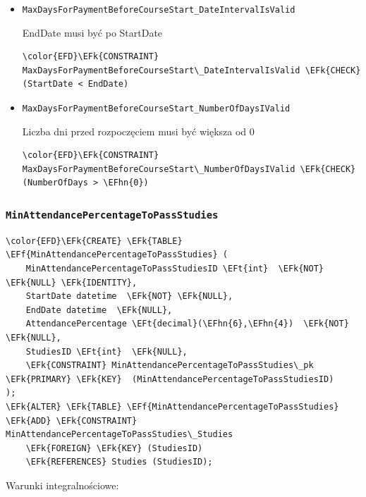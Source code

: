 \documentclass[11pt]{article}
\newcommand{\EFk}[1]{\textcolor{EFk}{\textbf{#1}}} %
\newcommand{\EFf}[1]{\textcolor{EFf}{#1}} %
\newcommand{\EFt}[1]{\textcolor{EFt}{\textbf{#1}}} %
\newcommand{\EFhn}[1]{\textcolor{EFhn}{#1}} %
\begin{document}
\begin{itemize}
\item \texttt{MaxDaysForPaymentBeforeCourseStart\_DateIntervalIsValid}

EndDate musi być po StartDate
\begin{Code}
\begin{Verbatim}
\color{EFD}\EFk{CONSTRAINT} MaxDaysForPaymentBeforeCourseStart\_DateIntervalIsValid \EFk{CHECK}
(StartDate < EndDate)
\end{Verbatim}
\end{Code}
\item \texttt{MaxDaysForPaymentBeforeCourseStart\_NumberOfDaysIValid}

Liczba dni przed rozpoczęciem musi być większa od 0
\begin{Code}
\begin{Verbatim}
\color{EFD}\EFk{CONSTRAINT} MaxDaysForPaymentBeforeCourseStart\_NumberOfDaysIValid \EFk{CHECK}
(NumberOfDays > \EFhn{0})
\end{Verbatim}
\end{Code}
\end{itemize}
\subsubsection{\texttt{MinAttendancePercentageToPassStudies}}
\label{sec:org1b6b5c1}
\begin{Code}
\begin{Verbatim}
\color{EFD}\EFk{CREATE} \EFk{TABLE} \EFf{MinAttendancePercentageToPassStudies} (
    MinAttendancePercentageToPassStudiesID \EFt{int}  \EFk{NOT} \EFk{NULL} \EFk{IDENTITY},
    StartDate datetime  \EFk{NOT} \EFk{NULL},
    EndDate datetime  \EFk{NULL},
    AttendancePercentage \EFt{decimal}(\EFhn{6},\EFhn{4})  \EFk{NOT} \EFk{NULL},
    StudiesID \EFt{int}  \EFk{NULL},
    \EFk{CONSTRAINT} MinAttendancePercentageToPassStudies\_pk \EFk{PRIMARY} \EFk{KEY}  (MinAttendancePercentageToPassStudiesID)
);
\EFk{ALTER} \EFk{TABLE} \EFf{MinAttendancePercentageToPassStudies} \EFk{ADD} \EFk{CONSTRAINT} MinAttendancePercentageToPassStudies\_Studies
    \EFk{FOREIGN} \EFk{KEY} (StudiesID)
    \EFk{REFERENCES} Studies (StudiesID);
\end{Verbatim}
\end{Code}
Warunki integralnościowe:
\end{document}
